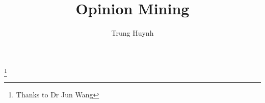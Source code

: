 \documentclass{article}
\begin{document}
\pagestyle{empty}
\title{\textbf{Opinion Mining}}
\author{Trung Huynh}



\maketitle


\thispagestyle{empty}
\thanks{Thanks to Dr Jun Wang}




\pagestyle{fancy}
\fancyhf{}
\lhead[]{\thepage}
\rhead[\thepage]{}


\doublespacing

\tableofcontents
\end{document}
